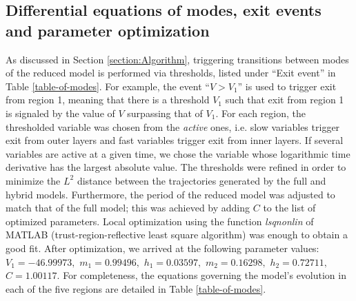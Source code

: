 \documentclass{llncs}
\begin{document}

\iffalse\FloatBarrier\fi
\subsection{Differential equations of modes,  {exit events and parameter optimization}}
 As  discussed in Section \ref{section:Algorithm}, triggering transitions
 between modes of the reduced model is performed via thresholds, listed under
 ``Exit event'' in Table \ref{table-of-modes}. For example, the event
 ``$V>V_1$'' is used to trigger exit from region 1, meaning that there is a
 threshold $V_1$ such that exit from region 1 is signaled by the value of $V$
 surpassing that of $V_1$.
  {For each region, the thresholded variable was chosen from the {\em
 active} ones, i.e. slow variables trigger exit from outer layers and fast
 variables trigger exit from inner layers. If several variables are active at a
 given time, we chose the variable whose logarithmic time derivative has the
 largest absolute value.  The thresholds were refined in order to minimize the
 $L^2$ distance between the trajectories generated by the full and hybrid
 models.  Furthermore, the period of the reduced model was adjusted to match
 that of the full model; this was achieved by adding $C$ to the list of
 optimized parameters.  Local optimization using the  function {\em lsqnonlin}
 of MATLAB (trust-region-reflective least square algorithm) was enough to
 obtain a good fit.}
     After optimization, we arrived at the
    following parameter values: $V_1 = -46.99973,$
                               $m_1 =   0.99496,$
                               $h_1 =   0.03597,$
                               $m_2 =   0.16298,$
                               $h_2 =   0.72711,$
                               $C = 1.00117$.
For
completeness, the equations governing the model's evolution in each of the five
regions are detailed in Table \ref{table-of-modes}.
\end{document}

